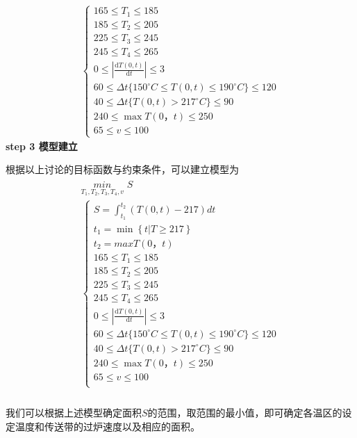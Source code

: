 \documentclass[../main.tex]{subfiles}
\begin{document}
  \begin{align}\label{8.8}
    \left\{\begin{array}{l}
      165 \leq T_1 \leq 185 
      \\
      185 \leq T_2 \leq 205
      \\
      225 \leq T_3 \leq 245   
    \\
    245 \leq T_4 \leq 265
    \\
      0\leq\left|\frac{\mathrm{d}T(0,t)}{\mathrm{d}t}\right|\leq 3
    \\ 
      60\leq\Delta t\{ 150^{\circ}C\leq T(0,t)\leq190^{\circ}C\}\leq120
    \\
      40\leq\Delta t\{T(0,t) > 217^{\circ}C\}\leq90 
    \\
      240\leq\max T(0，t)\leq250
    \\
      65\leq v\leq100
    \end{array} \right.      
  \end{align}
  \noindent \textbf{step 3 模型建立}
  \par 根据以上讨论的目标函数与约束条件，可以建立模型为
 \begin{align}
  \begin{array}{c}
    \underset{T_1,T_2,T_3,T_4,v}{min}\,\,S\\
    \left\{ \begin{array}{l}
    S=\int_{t_1}^{t_2}{\left( T\left( 0,t \right) -217 \right)}dt\\
    t_1=\min \left\{ t|T\ge 217 \right\}\\
    t_2=maxT\left( 0，t \right)\\
    165\leq T_1\leq 185\\
    185\leq T_2\leq 205\\
    225\leq T_3\leq 245\\
    245\leq T_4\leq 265\\
    0\leq \left| \frac{\text{d}T\left( 0,t \right)}{\text{d}t} \right|\leq 3\\
    60\leq \Delta t\{150^{\circ}C\leq T\left( 0,t \right) \leq 190^{\circ}C\}\leq 120\\
    40\leq \Delta t\{T\left( 0,t \right) >217^{\circ}C\}\leq 90\\
    240\leq \max T\left( 0，t \right) \leq 250\\
    65\leq v\leq 100\\
  \end{array} \right.\\
  \end{array}
 \end{align} 
 \par 我们可以根据上述模型确定面积$S$的范围，取范围的最小值，即可确定各温区的设定温度和传送带的过炉速度以及相应的面积。
  
\end{document}
